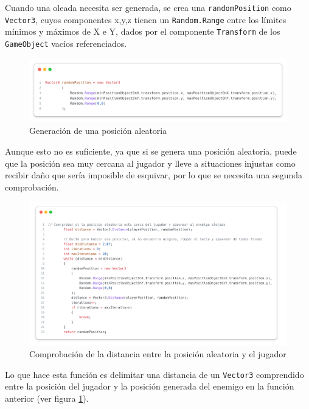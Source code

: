 \documentclass[11pt]{article}
\begin{document}
                Cuando una oleada necesita ser generada, se crea una \texttt{randomPosition} como \texttt{Vector3}, cuyos componentes x,y,z tienen un \texttt{Random.Range} entre los límites mínimos y máximos de X e Y, dados por el componente \texttt{Transform} de los \texttt{GameObject} vacíos referenciados.\\
                \begin{figure}[H]
                    \centering
                    \includegraphics[width=\textwidth]{Images/Misc/randompos.png}
                    \caption{Generación de una posición aleatoria}
                    \label{fig:randompos}
                \end{figure}

                Aunque esto no es suficiente, ya que si se genera una posición aleatoria, puede que la posición sea muy cercana al jugador y lleve a situaciones injustas como recibir daño que sería imposible de esquivar, por lo que se necesita una segunda comprobación.\\
                \begin{figure}[H] 
                    \centering
                    \includegraphics[width=\textwidth]{Images/Misc/comprobacionspawn.png}
                    \caption{Comprobación de la distancia entre la posición aleatoria y el jugador}
                \end{figure}
                Lo que hace esta función es delimitar una distancia de un \texttt{Vector3} comprendido entre la posición del jugador y la posición generada del enemigo en la función anterior (ver figura \ref{fig:randompos}).\\ 
\end{document}
